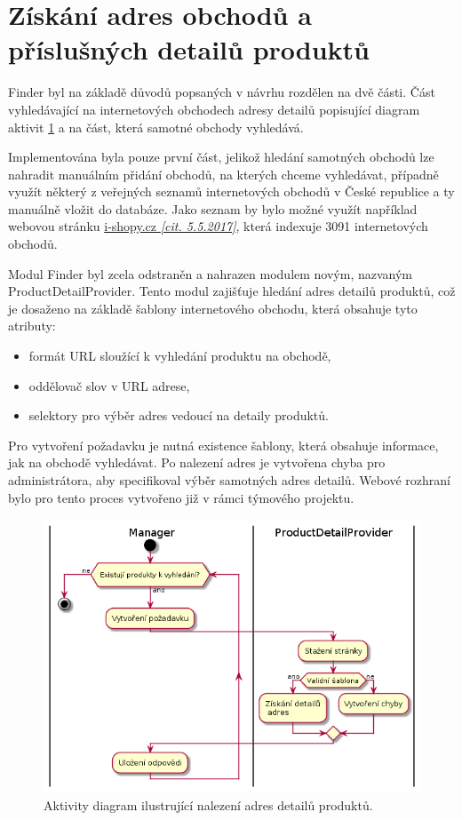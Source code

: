 \documentclass[thesis=B,czech]{FITthesis}[2012/06/26]
\begin{document}
\section{Získání adres obchodů a příslušných detailů produktů}
Finder byl na základě důvodů popsaných v návrhu rozdělen na dvě části. Část vyhledávající na internetových obchodech adresy detailů popisující diagram aktivit \ref{fig:pdp-diagram} a na část, která samotné obchody vyhledává.
\par
Implementována byla pouze první část, jelikož hledání samotných obchodů lze nahradit manuálním přidání obchodů, na kterých chceme vyhledávat, případně využít některý z veřejných seznamů internetových obchodů v České republice a ty manuálně vložit do databáze.
Jako seznam by bylo možné využít například webovou stránku \href{http://www.i-shopy.cz/}{i-shopy.cz \textit{[cit. 5.5.2017]}}, která indexuje 3091 internetových obchodů.
\par
Modul Finder byl zcela odstraněn a nahrazen modulem novým, nazvaným ProductDetailProvider.
Tento modul zajišťuje hledání adres detailů produktů, což je dosaženo na základě šablony internetového obchodu, která obsahuje 
tyto atributy:
\begin{itemize}
\item formát URL sloužící k vyhledání produktu na obchodě,
\item oddělovač slov v URL adrese,
\item selektory pro výběr adres vedoucí na detaily produktů.
\end{itemize}
Pro vytvoření požadavku je nutná existence šablony, která obsahuje informace, jak na obchodě vyhledávat.
Po nalezení adres je vytvořena chyba pro administrátora, aby specifikoval výběr samotných adres detailů. Webové rozhraní
bylo pro tento proces vytvořeno již v rámci týmového projektu.

\begin{figure}\centering
 	\includegraphics[width=1.0\textwidth]{resources/pdp-activity}
	\caption[Aktivity diagram ilustrující nalezení adres detailů produktů]{
	Aktivity diagram ilustrující nalezení adres detailů produktů.}\label{fig:pdp-diagram}
\end{figure}
\end{document}
